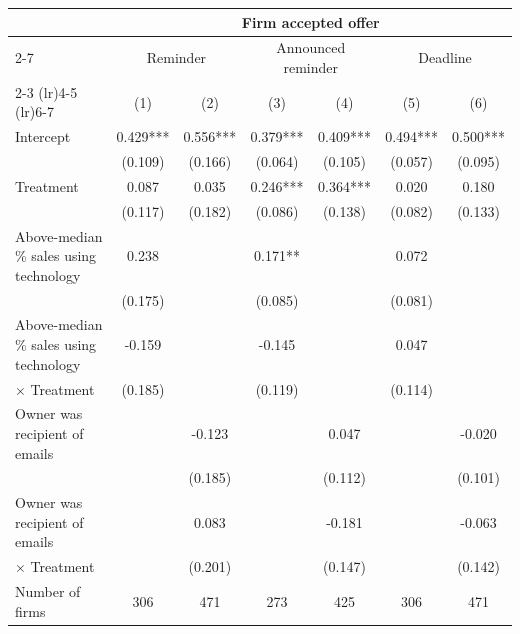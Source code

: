 \begin{tabular}{lcccccc}
\toprule
 & \multicolumn{6}{c}{Firm accepted offer} \\
\cmidrule(lr){2-7}
\multicolumn{1}{r}{Treatment:} & \multicolumn{2}{c}{Reminder} & \multicolumn{2}{c}{Announced reminder} & \multicolumn{2}{c}{Deadline} \\
\cmidrule(lr){2-3} \cmidrule(lr){4-5} \cmidrule(lr){6-7}
 & (1) & (2) & (3) & (4) & (5) & (6) \\
\midrule
Intercept & 0.429*** & 0.556*** & 0.379*** & 0.409*** & 0.494*** & 0.500*** \\ & (0.109) & (0.166) & (0.064) & (0.105) & (0.057) & (0.095) \\
Treatment & 0.087 & 0.035 & 0.246*** & 0.364*** & 0.020 & 0.180 \\ & (0.117) & (0.182) & (0.086) & (0.138) & (0.082) & (0.133) \\
Above-median \% sales using technology & 0.238 &  & 0.171** &  & 0.072 &  \\ & (0.175) &  & (0.085) &  & (0.081) \\
Above-median \% sales using technology & -0.159 &  & -0.145 &  & 0.047 &   \\
\hspace{1em} $\times$ Treatment & (0.185) &  & (0.119) &  & (0.114)  \\
Owner was recipient of emails &  & -0.123 &  & 0.047 &  & -0.020 \\ &  & (0.185) &  & (0.112) &  & (0.101) \\
Owner was recipient of emails &  & 0.083 &  & -0.181 &  & -0.063  \\
\hspace{1em} $\times$ Treatment &  & (0.201) &  & (0.147) &  & (0.142)  \\
\midrule
Number of firms & 306 & 471 & 273 & 425 & 306 & 471 \\
\bottomrule
\end{tabular}
